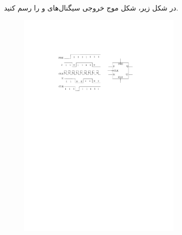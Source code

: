 
در شکل زیر، شکل موج خروجی سیگنال‌های  و  را رسم کنید.

\begin{figure}[h]
	\centering
	\includegraphics[width=0.7\textwidth]{fig/Q_basic6.pdf}
	\label{fig:Q_basic_6}
\end{figure}